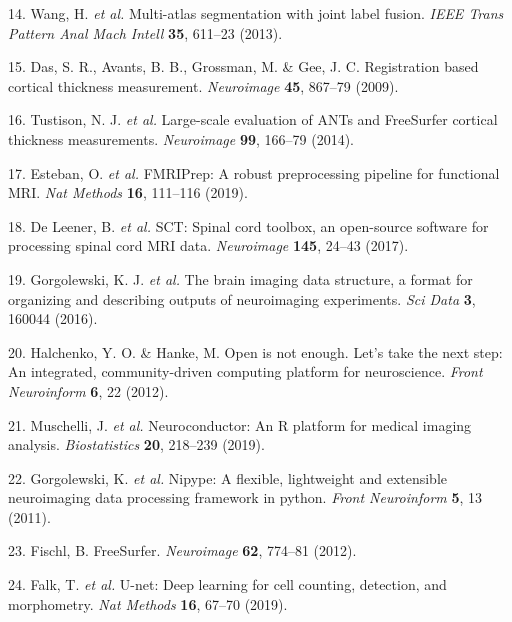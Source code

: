 \documentclass[12pt,]{article}
\begin{document}
\leavevmode\hypertarget{ref-Wang:2013ab}{}%
14. Wang, H. \emph{et al.} Multi-atlas segmentation with joint label
fusion. \emph{IEEE Trans Pattern Anal Mach Intell} \textbf{35}, 611--23
(2013).

\leavevmode\hypertarget{ref-Das:2009aa}{}%
15. Das, S. R., Avants, B. B., Grossman, M. \& Gee, J. C. Registration
based cortical thickness measurement. \emph{Neuroimage} \textbf{45},
867--79 (2009).

\leavevmode\hypertarget{ref-Tustison:2014ab}{}%
16. Tustison, N. J. \emph{et al.} Large-scale evaluation of ANTs and
FreeSurfer cortical thickness measurements. \emph{Neuroimage}
\textbf{99}, 166--79 (2014).

\leavevmode\hypertarget{ref-Esteban:2019aa}{}%
17. Esteban, O. \emph{et al.} FMRIPrep: A robust preprocessing pipeline
for functional MRI. \emph{Nat Methods} \textbf{16}, 111--116 (2019).

\leavevmode\hypertarget{ref-De-Leener:2017aa}{}%
18. De Leener, B. \emph{et al.} SCT: Spinal cord toolbox, an open-source
software for processing spinal cord MRI data. \emph{Neuroimage}
\textbf{145}, 24--43 (2017).

\leavevmode\hypertarget{ref-Gorgolewski:2016aa}{}%
19. Gorgolewski, K. J. \emph{et al.} The brain imaging data structure, a
format for organizing and describing outputs of neuroimaging
experiments. \emph{Sci Data} \textbf{3}, 160044 (2016).

\leavevmode\hypertarget{ref-Halchenko:2012aa}{}%
20. Halchenko, Y. O. \& Hanke, M. Open is not enough. Let's take the
next step: An integrated, community-driven computing platform for
neuroscience. \emph{Front Neuroinform} \textbf{6}, 22 (2012).

\leavevmode\hypertarget{ref-Muschelli:2019aa}{}%
21. Muschelli, J. \emph{et al.} Neuroconductor: An R platform for
medical imaging analysis. \emph{Biostatistics} \textbf{20}, 218--239
(2019).

\leavevmode\hypertarget{ref-Gorgolewski:2011aa}{}%
22. Gorgolewski, K. \emph{et al.} Nipype: A flexible, lightweight and
extensible neuroimaging data processing framework in python. \emph{Front
Neuroinform} \textbf{5}, 13 (2011).

\leavevmode\hypertarget{ref-Fischl:2012aa}{}%
23. Fischl, B. FreeSurfer. \emph{Neuroimage} \textbf{62}, 774--81
(2012).

\leavevmode\hypertarget{ref-Falk:2019aa}{}%
24. Falk, T. \emph{et al.} U-net: Deep learning for cell counting,
detection, and morphometry. \emph{Nat Methods} \textbf{16}, 67--70
(2019).
\end{document}
